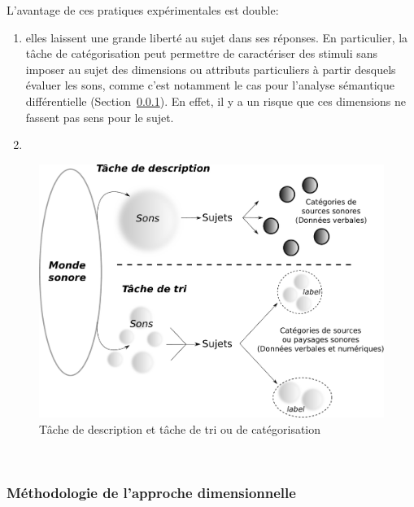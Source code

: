 L'avantage de ces pratiques expérimentales est double:

\begin{enumerate}
\item  elles laissent une grande liberté au sujet dans ses réponses. En particulier, la tâche de catégorisation peut permettre de caractériser des stimuli sans imposer au sujet des dimensions ou attributs particuliers à partir desquels évaluer les sons, comme c'est notamment le cas pour l'analyse sémantique différentielle (\Cf Section~\ref{}). En effet, il y a un risque que ces dimensions ne fassent pas sens pour le sujet. 
\item {}
\end{enumerate}

\begin{figure}[bth]
        \myfloatalign
        \includegraphics[width=\linewidth]{gfx/desCat}
        \caption{Tâche de description et tâche de tri ou de catégorisation}\label{fig:descat}
\end{figure}

 \\

\subsubsection{Méthodologie de l'approche dimensionnelle}


